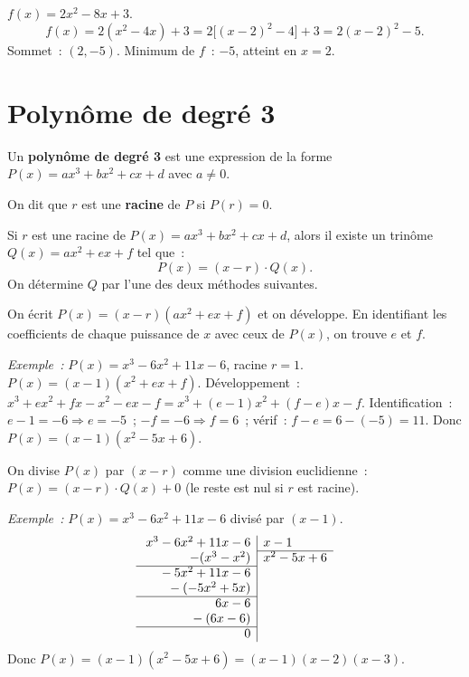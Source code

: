 \begin{ex}
$f(x) = 2x^2 - 8x + 3$.
$$f(x) = 2(x^2 - 4x) + 3 = 2\bigl[(x-2)^2 - 4\bigr] + 3
       = 2(x-2)^2 - 5.$$
Sommet~: $(2, -5)$. Minimum de $f$~: $-5$, atteint en $x=2$.
\end{ex}

\section{Polyn\^ome de degr\'e 3}

\begin{defn}
Un \textbf{polyn\^ome de degr\'e 3} est une expression de la forme
$P(x) = ax^3 + bx^2 + cx + d$ avec $a \ne 0$.

On dit que $r$ est une \textbf{racine} de $P$ si $P(r) = 0$.
\end{defn}

\begin{thm}
Si $r$ est une racine de $P(x) = ax^3+bx^2+cx+d$, alors il existe un
trin\^ome $Q(x) = ax^2 + ex + f$ tel que~:
$$P(x) = (x - r)\cdot Q(x).$$
On d\'etermine $Q$ par l'une des deux m\'ethodes suivantes.
\end{thm}

\begin{methode}
On \'ecrit $P(x) = (x-r)(ax^2+ex+f)$ et on d\'eveloppe.
En identifiant les coefficients de chaque puissance de $x$ avec ceux de $P(x)$,
on trouve $e$ et $f$.

\emph{Exemple~:} $P(x) = x^3 - 6x^2 + 11x - 6$, racine $r=1$.
$P(x) = (x-1)(x^2+ex+f)$.
D\'eveloppement~: $x^3 + ex^2 + fx - x^2 - ex - f
= x^3 + (e-1)x^2 + (f-e)x - f$.
Identification~: $e-1 = -6 \Rightarrow e=-5$~;
$-f = -6 \Rightarrow f=6$~; v\'erif~: $f-e = 6-(-5)=11$.\checkmark
Donc $P(x) = (x-1)(x^2-5x+6)$.
\end{methode}

\begin{methode}
On divise $P(x)$ par $(x-r)$ comme une division euclidienne~:
$P(x) = (x-r)\cdot Q(x) + 0$ (le reste est nul si $r$ est racine).

\emph{Exemple~:} $P(x) = x^3 - 6x^2 + 11x - 6$ divis\'e par $(x-1)$.
\[
\begin{array}{r|l}
x^3-6x^2+11x-6 & x-1\\
\cline{2-2}
-(x^3-x^2) & x^2-5x+6\\
\cline{1-1}
\phantom{x^3{}}-5x^2+11x-6 & \\
\phantom{x^3{}}-(-5x^2+5x) & \\
\cline{1-1}
\phantom{x^3-6x^2{}}6x-6 & \\
\phantom{x^3-6x^2{}}-(6x-6) & \\
\cline{1-1}
\phantom{x^3-6x^2+11x{}}0 &
\end{array}
\]
Donc $P(x) = (x-1)(x^2-5x+6) = (x-1)(x-2)(x-3)$.
\end{methode}

